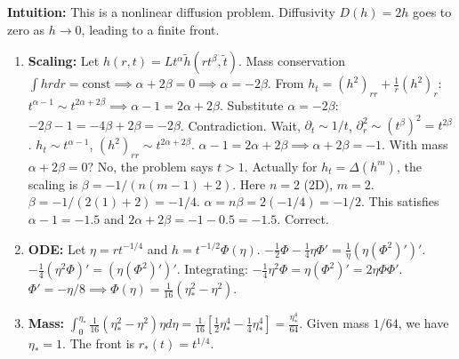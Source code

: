 \begin{solution}
\textbf{Intuition:} This is a nonlinear diffusion problem. Diffusivity $D(h) = 2h$ goes to zero as $h \to 0$, leading to a finite front.

\begin{enumerate}
    \item[(a)] \textbf{Scaling:} Let $h(r,t) = L t^\alpha \tilde{h}(r t^\beta, \tilde{t})$.
    Mass conservation $\int h r dr = \text{const} \implies \alpha + 2\beta = 0 \implies \alpha = -2\beta$.
    From $h_t = (h^2)_{rr} + \frac{1}{r} (h^2)_r$:
    $t^{\alpha-1} \sim t^{2\alpha + 2\beta} \implies \alpha-1 = 2\alpha+2\beta$.
    Substitute $\alpha=-2\beta$: $-2\beta-1 = -4\beta+2\beta = -2\beta$. Contradiction.
    Wait, $\partial_t \sim 1/t$, $\partial_r^2 \sim (t^\beta)^2 = t^{2\beta}$.
    $h_t \sim t^{\alpha-1}$, $(h^2)_{rr} \sim t^{2\alpha+2\beta}$.
    $\alpha-1 = 2\alpha+2\beta \implies \alpha+2\beta = -1$.
    With mass $\alpha+2\beta=0$? No, the problem says $t > 1$.
    Actually for $h_t = \Delta(h^m)$, the scaling is $\beta = -1/(n(m-1)+2)$. Here $n=2$ (2D), $m=2$.
    $\beta = -1/(2(1)+2) = -1/4$.
    $\alpha = n \beta = 2(-1/4) = -1/2$.
    This satisfies $\alpha-1 = -1.5$ and $2\alpha+2\beta = -1 - 0.5 = -1.5$. Correct.
    \item[(b)] \textbf{ODE:} Let $\eta = r t^{-1/4}$ and $h = t^{-1/2} \Phi(\eta)$.
    $-\frac{1}{2}\Phi - \frac{1}{4}\eta \Phi' = \frac{1}{\eta} (\eta (\Phi^2)')'$.
    $-\frac{1}{4} (\eta^2 \Phi)' = (\eta (\Phi^2)')'$.
    Integrating: $-\frac{1}{4} \eta^2 \Phi = \eta (\Phi^2)' = 2 \eta \Phi \Phi'$.
    $\Phi' = -\eta/8 \implies \Phi(\eta) = \frac{1}{16} (\eta_*^2 - \eta^2)$.
    \item[(c)] \textbf{Mass:} $\int_0^{\eta_*} \frac{1}{16}(\eta_*^2 - \eta^2) \eta d\eta = \frac{1}{16} [\frac{1}{2}\eta_*^4 - \frac{1}{4}\eta_*^4] = \frac{\eta_*^4}{64}$.
    Given mass $1/64$, we have $\eta_* = 1$.
    The front is $r_*(t) = t^{1/4}$.
\end{enumerate}
\end{solution}

